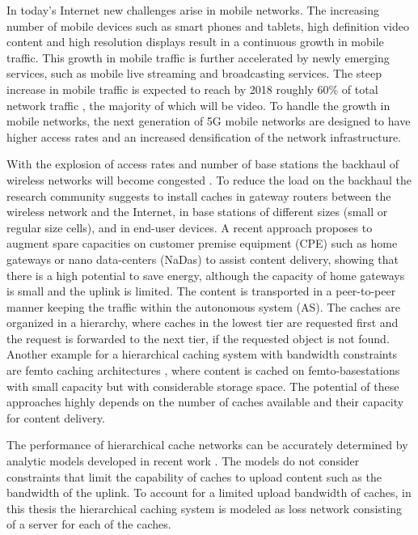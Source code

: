 In today's Internet new challenges arise in mobile networks.
The increasing number of mobile devices such as smart phones and tablets, high definition video content and high resolution displays result in a continuous growth in mobile traffic.
This growth in mobile traffic is further accelerated by newly emerging services, such as mobile live streaming and broadcasting services.
The steep increase in mobile traffic is expected to reach by 2018 roughly 60\% of total network traffic \cite{cisco2016}, the majority of which will be video.
To handle the growth in mobile networks, the next generation of 5G mobile networks are designed to have higher access rates and an increased densification of the network infrastructure.

With the explosion of access rates and number of base stations the backhaul of wireless networks will become congested \cite{paschos2016wireless}.
To reduce the load on the backhaul the research community suggests to install caches in gateway routers between the wireless network and the Internet, in base stations of different sizes (small or regular size cells), and in end-user devices.
A recent approach \cite{valancius2009greening} proposes to augment spare capacities on customer premise equipment (CPE) such as home gateways or nano data-centers (NaDas) to assist content delivery, showing that there is a high potential to save energy, although the capacity of home gateways is small and the uplink is limited.
The content is transported in a peer-to-peer manner keeping the traffic within the autonomous system (AS).
The caches are organized in a hierarchy, where caches in the lowest tier are requested first and the request is forwarded to the next tier, if the requested object is not found.
Another example for a hierarchical caching system with bandwidth constraints are femto caching architectures \cite{golrezaei2013femtocaching}, where content is cached on femto-basestations with small capacity but with considerable storage space.
The potential of these approaches highly depends on the number of caches available and their capacity for content delivery.

The performance of hierarchical cache networks can be accurately determined by analytic models developed in recent work \cite{che2002hierarchical, martina2014unified}.
The models do not consider constraints that limit the capability of caches to upload content such as the bandwidth of the uplink.
To account for a limited upload bandwidth of caches, in this thesis the hierarchical caching system is modeled as loss network consisting of a server for each of the caches.

